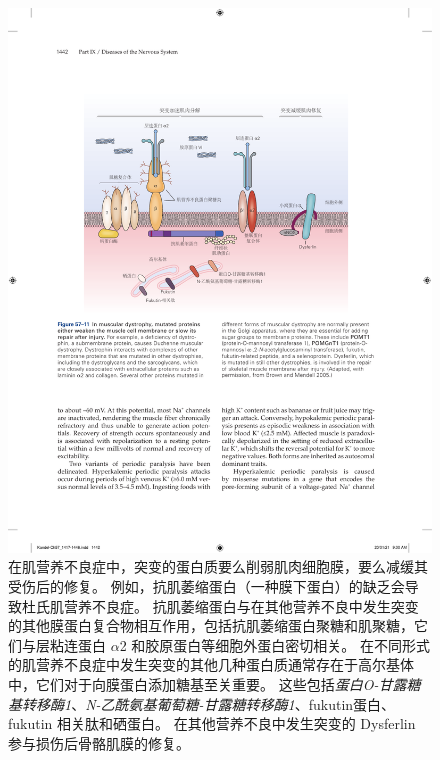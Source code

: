 \begin{figure}[htbp]
	\centering
	\includegraphics[width=1.0\linewidth]{chap57/fig_57_11}
	\caption{在肌营养不良症中，突变的蛋白质要么削弱肌肉细胞膜，要么减缓其受伤后的修复。
		例如，抗肌萎缩蛋白（一种膜下蛋白）的缺乏会导致杜氏肌营养不良症。
		抗肌萎缩蛋白与在其他营养不良中发生突变的其他膜蛋白复合物相互作用，包括抗肌萎缩蛋白聚糖和肌聚糖，它们与层粘连蛋白 $\alpha$2 和胶原蛋白等细胞外蛋白密切相关。
		在不同形式的肌营养不良症中发生突变的其他几种蛋白质通常存在于高尔基体中，它们对于向膜蛋白添加糖基至关重要。
		这些包括\textit{蛋白O-甘露糖基转移酶1}、\textit{N-乙酰氨基葡萄糖-甘露糖转移酶1}、fukutin蛋白、fukutin 相关肽和硒蛋白。
		在其他营养不良中发生突变的 Dysferlin 参与损伤后骨骼肌膜的修复\cite{brown2005harrison}。}
	\label{fig:57_11}
\end{figure}



